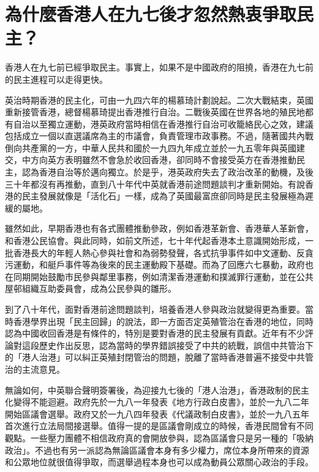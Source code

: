 \section{為什麼香港人在九七後才忽然熱衷爭取民主？}

香港人在九七前已經爭取民主。事實上，如果不是中國政府的阻撓，香港在九七前的民主進程可以走得更快。

英治時期香港的民主化，可由一九四六年的楊慕琦計劃說起。二次大戰結束，英國重新接管香港，總督楊慕琦提出香港推行自治。二戰後英國在世界各地的殖民地都有自治以至獨立運動，港英政府當時相信在香港推行自治可收籠絡民心之效，建議包括成立一個以直選議席為主的市議會，負責管理市政事務。不過，隨著國共內戰倒向共產黨的一方，中華人民共和國於一九四九年成立並於一九五零年與英國建交，中方向英方表明雖然不會急於收回香港，卻同時不會接受英方在香港推動民主，認為香港自治等於邁向獨立。於是乎，港英政府失去了政治改革的動機，及後三十年都沒有再推動，直到八十年代中英就香港前途問題談判才重新開始。有說香港的民主發展就像是「活化石」一樣，成為了英國最富庶卻同時是民主發展極為遲緩的屬地。

雖然如此，早期香港也有各式團體推動參政，例如香港革新會、香港華人革新會，和香港公民協會。與此同時，如前文所述，七十年代起香港本土意識開始形成，一批香港長大的年輕人熱心參與社會和為弱勢發聲，各式抗爭事件如中文運動、反貪污運動，和艇戶事件等為後來的民主運動殿下基礎。而為了回應六七暴動，政府也在同期開始鼓勵市民參與鄰里事務，例如清潔香港運動和撲滅罪行運動，並在公共屋邨組織互助委員會，成為公民參與的雛形。

到了八十年代，面對香港前途問題談判，培養香港人參與政治就變得更為重要。當時香港學界出現「民主回歸」的說法，即一方面否定英殖管治在香港的地位，同時認為中國收回香港是有條件的，特別是要對香港的民主發展有貢獻。近年有不少評論對這段歷史作出反思，認為當時的學界錯誤接受了中共的統戰，誤信中共管治下的「港人治港」可以糾正英殖封閉管治的問題，脫離了當時香港普遍不接受中共管治的主流意見。

無論如何，中英聯合聲明簽署後，為迎接九七後的「港人治港」，香港政制的民主化變得不能迴避。政府先於一九八一年發表《地方行政白皮書》，並於一九八二年開始區議會選舉。政府又於一九八四年發表《代議政制白皮書》，並於一九八五年首次進行立法局間接選舉。值得一提的是區議會剛成立的時候，香港民間曾有不同觀點。一些壓力團體不相信政府真的會開放參與，認為區議會只是另一種的「吸納政治」。不過也有另一派認為無論區議會本身有多少權力，席位本身所帶來的資源和公眾地位就很值得爭取，而選舉過程本身也可以成為動員公眾關心政治的手段。


